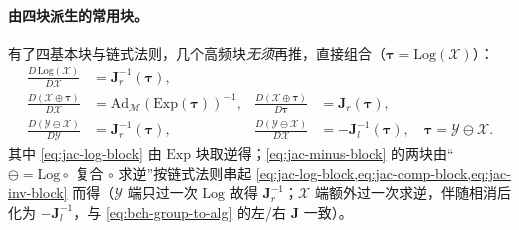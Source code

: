 \paragraph{由四块派生的常用块。}有了四基本块与链式法则，几个高频块\emph{无须}再推，直接组合（$\boldsymbol{\tau}=\mathrm{Log}(\mathcal{X})$）：
\begin{align}
  \frac{D\,\mathrm{Log}(\mathcal{X})}{D\mathcal{X}}&=\mathbf{J}_r^{-1}(\boldsymbol{\tau}),
  \label{eq:jac-log-block}\\
  \frac{D(\mathcal{X}\oplus\boldsymbol{\tau})}{D\mathcal{X}}&=\mathrm{Ad}_{\mathcal{M}}(\mathrm{Exp}(\boldsymbol{\tau}))^{-1},
  &\frac{D(\mathcal{X}\oplus\boldsymbol{\tau})}{D\boldsymbol{\tau}}&=\mathbf{J}_r(\boldsymbol{\tau}),
  \label{eq:jac-oplus-block}\\
  \frac{D(\mathcal{Y}\ominus\mathcal{X})}{D\mathcal{Y}}&=\mathbf{J}_r^{-1}(\boldsymbol{\tau}),
  &\frac{D(\mathcal{Y}\ominus\mathcal{X})}{D\mathcal{X}}&=-\mathbf{J}_l^{-1}(\boldsymbol{\tau}),
  \quad\boldsymbol{\tau}=\mathcal{Y}\ominus\mathcal{X}.
  \label{eq:jac-minus-block}
\end{align}
其中 \cref{eq:jac-log-block} 由 $\mathrm{Exp}$ 块取逆得；\cref{eq:jac-minus-block} 的两块由“$\ominus=\mathrm{Log}\circ$ 复合 $\circ$ 求逆”按链式法则串起 \cref{eq:jac-log-block,eq:jac-comp-block,eq:jac-inv-block} 而得（$\mathcal{Y}$ 端只过一次 $\mathrm{Log}$ 故得 $\mathbf{J}_r^{-1}$；$\mathcal{X}$ 端额外过一次求逆，伴随相消后化为 $-\mathbf{J}_l^{-1}$，与 \cref{eq:bch-group-to-alg} 的左/右 $\mathbf{J}$ 一致）。

